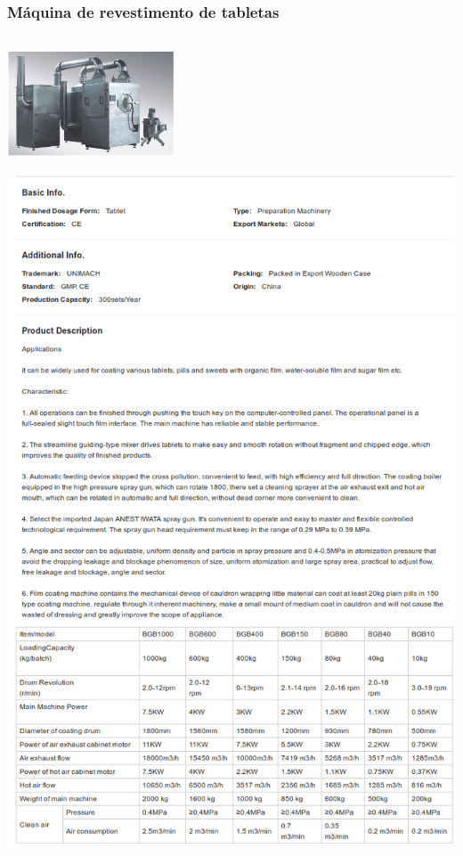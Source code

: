 \subsubsection{Máquina de revestimento de tabletas}
\includegraphics[width=5cm,height=4cm,keepaspectratio]{Datasheets/4Foto.png} 
\\
\includegraphics[width=15cm,height=20cm,keepaspectratio]{Datasheets/4MaquinaRevestimiento.png} 
\newpage

